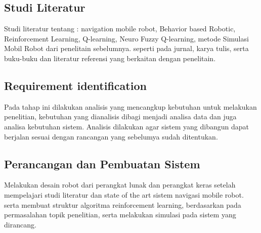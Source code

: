 
\subsection{Studi Literatur}
Studi literatur tentang :
navigation mobile robot, Behavior based Robotic,  Reinforcement Learning, 
Q-learning, Neuro Fuzzy Q-learning, metode Simulasi Mobil Robot dari penelitain sebelumnya.
seperti pada jurnal, karya tulis, serta buku-buku dan literatur referensi yang berkaitan dengan penelitain.

\subsection{Requirement identification}

Pada tahap ini dilakukan analisis yang mencangkup kebutuhan untuk melakukan penelitian, 
kebutuhan yang dianalisis dibagi menjadi analisa data dan juga analisa kebutuhan sistem. 
Analisis dilakukan agar sistem yang dibangun dapat berjalan sesuai dengan rancangan yang sebelumya sudah ditentukan.

\subsection{Perancangan dan Pembuatan Sistem}
Melakukan desain robot dari perangkat lunak dan perangkat keras setelah mempelajari studi literatur dan state of the art
sistem navigasi mobile robot. serta membuat struktur algoritma reinforcement learning, 
berdasarkan pada permasalahan topik penelitian, serta melakukan simulasi pada sistem 
yang dirancang.

